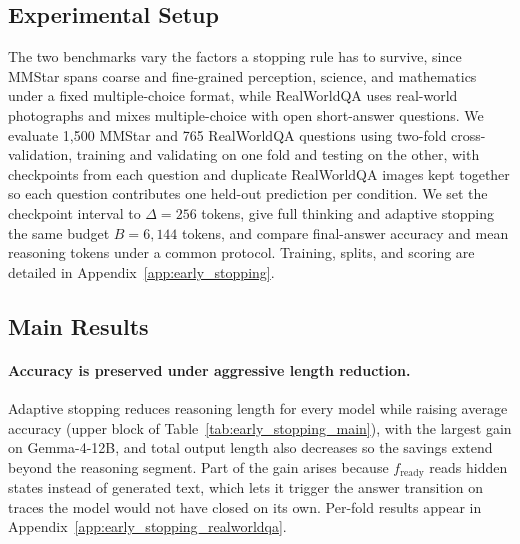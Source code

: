 \documentclass{article} %
\begin{document}
\subsection{Experimental Setup}

The two benchmarks vary the factors a stopping rule has to survive, since MMStar \citep{chen2024we} spans coarse and fine-grained perception, science, and mathematics under a fixed multiple-choice format, while RealWorldQA \citep{xai2024realworldqa} uses real-world photographs and mixes multiple-choice with open short-answer questions. We evaluate 1,500 MMStar and 765 RealWorldQA questions using two-fold cross-validation, training and validating on one fold and testing on the other, with checkpoints from each question and duplicate RealWorldQA images kept together so each question contributes one held-out prediction per condition. We set the checkpoint interval to $\Delta=256$ tokens, give full thinking and adaptive stopping the same budget $B=6{,}144$ tokens, and compare final-answer accuracy and mean reasoning tokens under a common protocol. Training, splits, and scoring are detailed in Appendix~\ref{app:early_stopping}.

\subsection{Main Results}

\paragraph{Accuracy is preserved under aggressive length reduction.}
Adaptive stopping reduces reasoning length for every model while raising average accuracy (upper block of Table~\ref{tab:early_stopping_main}), with the largest gain on Gemma-4-12B, and total output length also decreases so the savings extend beyond the reasoning segment. Part of the gain arises because $f_{\mathrm{ready}}$ reads hidden states instead of generated text, which lets it trigger the answer transition on traces the model would not have closed on its own. Per-fold results appear in Appendix~\ref{app:early_stopping_realworldqa}.
\end{document}
